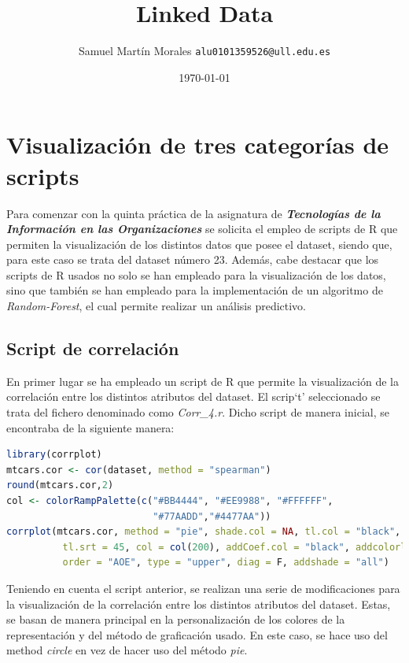 \documentclass[11pt]{report}
\begin{document}

\title{Linked Data}
\author{Samuel Martín Morales  \texttt{alu0101359526@ull.edu.es}}
\date{\today}

\maketitle

\tableofcontents

\chapter{Visualización de tres categorías de scripts}

Para comenzar con la quinta práctica de la asignatura de \emph{\textbf{Tecnologías de la Información en las Organizaciones}} se solicita el empleo de scripts de R que permiten la visualización de los distintos datos que posee el dataset, siendo que, para este caso se trata del dataset número 23. Además, cabe destacar que los scripts de R usados no solo se han empleado para la visualización de los datos, sino que también se han empleado para la implementación de un algoritmo de \emph{Random-Forest}, el cual permite realizar un análisis predictivo.

\section{Script de correlación}

En primer lugar se ha empleado un script de R que permite la visualización de la correlación entre los distintos atributos del dataset. El scrip`t' seleccionado se trata del fichero denominado como \emph{Corr\_4.r}. Dicho script de manera inicial, se encontraba de la siguiente manera:

\begin{lstlisting}[language=R, breaklines=true, basicstyle=\small\ttfamily]
library(corrplot)
mtcars.cor <- cor(dataset, method = "spearman")
round(mtcars.cor,2)
col <- colorRampPalette(c("#BB4444", "#EE9988", "#FFFFFF",
                          "#77AADD","#4477AA"))		 
corrplot(mtcars.cor, method = "pie", shade.col = NA, tl.col = "black",
          tl.srt = 45, col = col(200), addCoef.col = "black", addcolorlabel = "no",
          order = "AOE", type = "upper", diag = F, addshade = "all")	
\end{lstlisting}

Teniendo en cuenta el script anterior, se realizan una serie de modificaciones para la visualización de la correlación entre los distintos atributos del dataset. Estas, se basan de manera principal en la personalización de los colores de la representación y del método de graficación usado. En este caso, se hace uso del method \emph{circle} en vez de hacer uso del método \emph{pie}.
\end{document}
